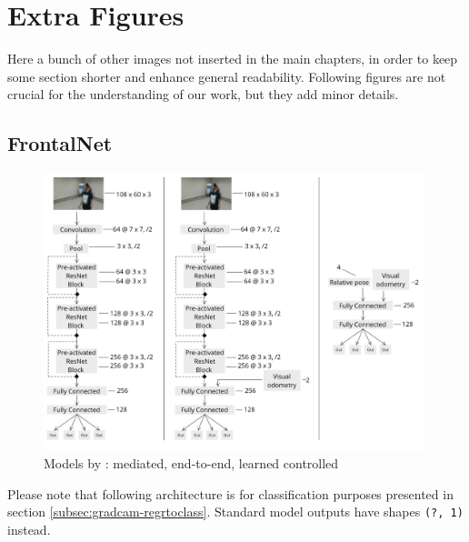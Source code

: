
\chapter{Extra Figures}
\label{chap:extra-figures}

Here a bunch of other images not inserted in the main chapters, in order to keep some section shorter and enhance general readability. Following figures are not crucial for the understanding of our work, but they add minor details.




\section{FrontalNet}
\label{sec:extra-frontalnet}

\begin{figure}[!h]
	\centering
	\includegraphics[width=0.99\textwidth]{"contents/images/03-frontalnet-1"}
	\caption[Models by \cite{mantegazza2019visionbased}: mediated, end-to-end, learned controlled]{Models by \cite{mantegazza2019visionbased}: mediated, end-to-end, learned controlled}
	\label{fig:frontalnet-architecture-paper3approaches}
\end{figure}

Please note that following architecture is for classification purposes presented in section \ref{subsec:gradcam-regrtoclass}. Standard model outputs have shapes \texttt{(?, 1)} instead.

